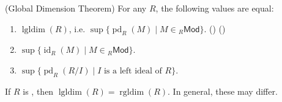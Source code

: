 \begin{theorem} \label{theorem:global_dimension_theorem_for_rings}
(Global Dimension Theorem) For any  $R$, the following values are equal:
\begin{enumerate}
    \item $\operatorname{lgldim}(R)$, i.e. $\sup \{ \operatorname{pd}_R(M) \mid M \in {}_R\mathsf{Mod} \}$. () ()
    \item $\sup \{ \operatorname{id}_R(M) \mid M \in {}_R\mathsf{Mod} \}$.
    \item $\sup \{ \operatorname{pd}_R(R/I) \mid I \text{ is a left ideal of } R \}$.
\end{enumerate}
If $R$ is , then $\operatorname{lgldim}(R) = \operatorname{rgldim}(R)$. In general, these may differ.
\end{theorem}